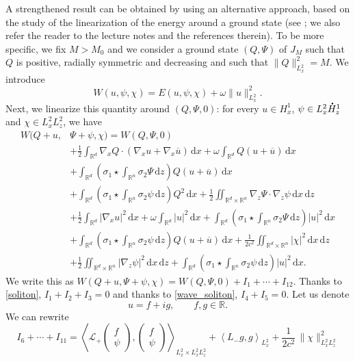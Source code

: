 \documentclass[JEP,XML,SOM,NoEqCountersInSection,NoFloatCountersInSection,Unicode,published]{cedram}
\let\bar\oldbar
\theoremstyle{definition}
\newcommand*{\overbigdot}[1]{%
\accentset{\mbox{\large\bfseries .}}{#1}}
\let\bar\overline
\newcommand{\R}{\mathbb{R}}
\let\ds\displaystyle
\newcommand{\ud}{\, {\mathrm{d}}}
\begin{document}
A strengthened result can be obtained by using an alternative approach, based on the study of the linearization of the energy around a ground state (see
\cite{MaMe,Weinstein1,Weinstein2}; we also refer the reader to the lecture notes \cite[\S 2.6]{Martel} and the references therein). To be more specific, we fix $M>M_{0}$ and we consider a ground state $(Q,\Psi)$ of $J_{M}$ such that $Q$ is positive, radially symmetric and decreasing and such that $\|Q\|_{L_{x}^{2}}^{2}=M$. We introduce
\[
W(u,\psi,\chi)=E(u,\psi,\chi)+\omega\|u\|_{L_{x}^{2}}^{2}.
\]
Next, we linearize this quantity around $(Q,\Psi,0)$: for every $u\in H_{x}^{1}$, $\psi\in L_{x}^{2}\overbigdot{H}_{z}^{1}$ and $\chi\in L_{x}^{2}L_{z}^{2}$, we have\vspace*{-3pt}
\begin{align*}
\ds W(Q+u,&\Psi+\psi,\chi)=W(Q,\Psi,0)\\
&+ \ds \frac{1}{2}\int_{\R^{d}}\nabla_{x}Q\cdot(\nabla_{x}u+\nabla_{x}\bar{u})\ud x+\omega\int_{\R^{d}}Q(u+\bar{u})\ud x
\\
&+\ds\int_{\R^{d}}\left(\sigma_{1}\star\int_{\R^{n}}\sigma_{2}\Psi\ud z\right)Q(u+\bar{u})\ud x
\\
&+\ds\int_{\R^{d}}\left(\sigma_{1}\star\int_{\R^{n}}\sigma_{2}\psi\ud z\right)Q^{2}\ud x+\frac{1}{2}\iint_{\R^{d}\times\R^{n}}\nabla_{z}\Psi\cdot\nabla_{z}\psi\ud x\ud z
\\
&\ds +\frac{1}{2}\int_{\R^{d}}|\nabla_{x}u|^{2}\ud x+\omega\int_{\R^{d}}|u|^{2}\ud x+\int_{\R^{d}}\left(\sigma_{1}\star\int_{\R^{n}}\sigma_{2}\Psi\ud z\right)|u|^{2}\ud x\\
&\ds +\int_{\R^{d}}\left(\sigma_{1}\star\int_{\R^{n}}\sigma_{2}\psi\ud z\right)Q(u+\bar{u})\ud x+\frac{1}{2c^{2}}\iint_{\R^{d}\times\R^{n}}|\chi|^{2}\ud x\ud z
\\
&+\ds\frac{1}{2}\iint_{\R^{d}\times\R^{n}}|\nabla_{z}\psi|^{2}\ud x\ud z
+ \ds \int_{\R^{d}}\left(\sigma_{1}\star\int_{\R^{n}}\sigma_{2}\psi\ud z\right)|u|^{2}\ud x.
\end{align*}
We write this as $W(Q+u,\Psi+\psi,\chi)=W(Q,\Psi,0)+I_1+\cdots+I_{12}$.
Thanks to \eqref{soliton}, $I_1+I_2+I_3=0$ and thanks to \eqref{wave_soliton}, $I_4+I_5=0$. Let us denote\vspace*{-3pt}
\[
u=f+i g,\qquad f,g\in \mathbb R.
\]
We can rewrite\vspace*{-3pt}
\[
I_ 6+\cdots+I_{11}= \left\langle\mathcal{L}_{+}\begin{pmatrix} f\\\psi \end{pmatrix},\begin{pmatrix} f\\\psi \end{pmatrix}\right\rangle_{L_{x}^{2}\times L_{x}^{2}L_{z}^{2}}+\left\langle L_{-}g,g\right\rangle_{L_{x}^{2}}+\frac{1}{2c^{2}}\,\|\chi\|_{L_{x}^{2}L_{z}^{2}}^{2}
\]
\end{document}
